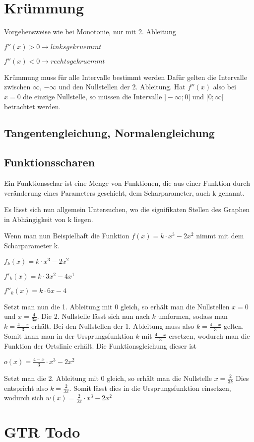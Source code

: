 \section*{Krümmung}
Vorgehensweise wie bei Monotonie, nur mit 2. Ableitung

$f''(x) > 0 \rightarrow links gekruemmt$

$f''(x) < 0 \rightarrow rechts gekruemmt$

Krümmung muss für alle Intervalle bestimmt werden
Dafür gelten die Intervalle zwischen $\infty$, $-\infty$ und den Nullstellen der 2. Ableitung.
Hat $f''(x)$ also bei $x = 0$ die einzige Nullstelle, so müssen die Intervalle $]-\infty;0]$ und $[0;\infty[$
betrachtet werden.

\subsection{Tangentengleichung, Normalengleichung}

\subsection{Funktionsscharen}

Ein Funktionsschar ist eine Menge von Funktionen, die aus einer Funktion durch veränderung
eines Parameters geschieht, dem Scharparameter, auch k genannt.

Es lässt sich nun allgemein Untersuchen, wo die signifikaten Stellen des Graphen in Abhängigkeit
von k liegen.

Wenn man nun Beispielhaft die Funktion $f(x) = k \cdot x^3 - 2x^2$ nimmt mit dem Scharparameter k.

$f_{k}(x) = k \cdot x^3 - 2x^2$

$f'_{k}(x) = k \cdot 3x^2 - 4x^1$

$f''_{k}(x) = k \cdot 6x - 4$

Setzt man nun die 1. Ableitung mit 0 gleich, so erhält man die Nullstellen $x = 0$ und $x = \frac{4}{3k}$.
Die 2. Nullstelle lässt sich nun nach $k$ umformen, sodass man $k = \frac{4 - x}{3}$ erhält.
Bei den Nullstellen der 1. Ableitung muss also $k = \frac{4-x}{3}$ gelten.
Somit kann man in der Ursprungsfunktion $k$ mit $\frac{4-x}{3}$ ersetzen, wodurch man die Funktion
der Ortslinie erhält. Die Funktionsgleichung dieser ist \newline

$o(x) = \frac{4-x}{3} \cdot x^3 - 2x^2$ \newline

Setzt man die 2. Ableitung mit 0 gleich, so erhält man die Nullstelle $x = \frac{2}{3k}$
Dies entspricht also $k = \frac{2}{3x}$. Somit lässt dies in die Ursprungsfunktion einsetzen,
wodurch sich $w(x) = \frac{2}{3x} \cdot x^3 - 2x^2$


\section{GTR Todo}
